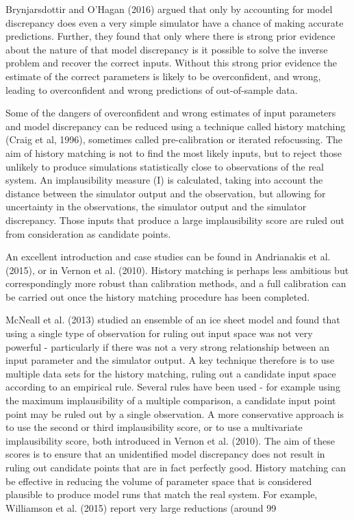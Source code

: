 \documentclass[gmd, manuscript]{copernicus}
\begin{document}
Brynjarsdottir and O'Hagan (2016) argued that only by accounting for model discrepancy does even a very simple simulator have a chance of making accurate predictions. Further, they found that only where there is strong prior evidence about the nature of that model discrepancy is it possible to solve the inverse problem and recover the correct inputs. Without this strong prior evidence the estimate of the correct parameters is likely to be overconfident, and wrong, leading to overconfident and wrong predictions of out-of-sample data.

Some of the dangers of overconfident and wrong estimates of input parameters and model discrepancy can be reduced using a technique called history matching (Craig et al, 1996), sometimes called pre-calibration or iterated refocussing. The aim of history matching is not to find the most likely inputs, but to reject those unlikely to produce simulations statistically close to observations of the real system. An implausibility measure (I) is calculated, taking into account the distance between the simulator output and the observation, but allowing for uncertainty in the observations, the simulator output and the simulator discrepancy. Those inputs that produce a large implausibility score are ruled out from consideration as candidate points.

An excellent introduction and case studies can be found in Andrianakis et al. (2015), or in Vernon et al. (2010). History matching is perhaps less ambitious but correspondingly more robust than calibration methods, and a full calibration can be carried out once the history matching procedure has been completed.

McNeall et al. (2013) studied an ensemble of an ice sheet model and found that using a single type of observation for ruling out input space was not very powerful - particularly if there was not a very strong relationship between an input parameter and the simulator output.  A key technique therefore is to use multiple data sets for the history matching, ruling out a candidate input space according to an empirical rule. Several rules have been used - for example using the maximum implausibility of a multiple comparison, a candidate input point point may be ruled out by a single observation. A more conservative approach is to use the second or third implausibility score, or to use a multivariate implausibility score, both introduced in Vernon et al. (2010). The aim of these scores is to ensure that an unidentified model discrepancy does not result in ruling out candidate points that are in fact perfectly good. History matching can be effective in reducing the volume of parameter space that is considered plausible to produce model runs that match the real system. For example, Williamson et al. (2015) report very large reductions (around 99%
\end{document}
